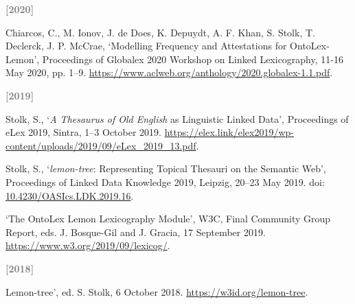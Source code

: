 \begin{list}{}


\bigskip\item
\textcolor{gray}{\textbf{[2020]}}
\begin{comment}
%
\item
Stolk, S. and K. McGlinn, `Validation of IfcOWL Datasets Using SHACL', Proceedings of LDAC 2020, Dublin, 17–9 June 2020, pp. 91–104. \url{http://ceur-ws.org/Vol-2636/07paper.pdf}. 
\lbl{Conference paper}
\end{comment}
%
\item
Chiarcos, C., M. Ionov, J. de Does, K. Depuydt, A. F. Khan, S. Stolk, T. Declerck, J. P. McCrae, `Modelling Frequency and Attestations for OntoLex-Lemon', Proceedings of Globalex 2020 Workshop on Linked Lexicography, 11-16 May 2020, pp. 1–9. \url{https://www.aclweb.org/anthology/2020.globalex-1.1.pdf}. 


\bigskip\item
\textcolor{gray}{\textbf{[2019]}}
%
\item
Stolk, S., `\textit{A Thesaurus of Old English} as Linguistic Linked Data', Proceedings of eLex 2019, Sintra, 1–3 October 2019. \url{https://elex.link/elex2019/wp-content/uploads/2019/09/eLex_2019_13.pdf}. 
 \linebreak
{}

\item
Stolk, S., `\textit{lemon-tree}: Representing Topical Thesauri on the Semantic Web', Proceedings of Linked Data Knowledge 2019, Leipzig, 20–23 May 2019. doi: \href{https://doi.org/10.4230/OASIcs.LDK.2019.16}{\url{10.4230/OASIcs.LDK.2019.16}}. 

\item
`The OntoLex Lemon Lexicography Module', W3C, Final Community Group Report, eds. J. Bosque-Gil and J. Gracia, 17 September 2019. \url{https://www.w3.org/2019/09/lexicog/}. 

\bigskip\item
\textcolor{gray}{\textbf{[2018]}}
%
\item
Lemon-tree', ed. S. Stolk, 6 October 2018. \url{https://w3id.org/lemon-tree}. 

\begin{comment}
\item
Böhms, M., B. Luiten, A. O'Keeffe, S. Stolk, L. Wikström, M. Weise, `D4. Principles for a European Road OTL', Report of INTERLINK consortium, 2 November 2018. \url{https://www.roadotl.eu/publications/}. 
\lbl{Research report}


\end{comment}
\end{list}
